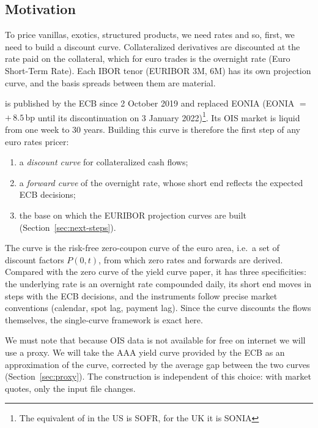 \documentclass[11pt,a4paper]{article}
\theoremstyle{plain}
\theoremstyle{definition}
\newcommand{\bp}{\,\mathrm{bp}}
\newcommand{\estr}{\text{\texteuro STR}}
\begin{document}
\subsection{Motivation}
To price vanillas, exotics, structured products, we need rates and so, first, we need to build a discount curve. Collateralized derivatives are discounted at the rate paid on the collateral, which for euro trades is the overnight rate \estr{} (Euro Short-Term Rate). Each IBOR tenor (EURIBOR 3M, 6M) has its own projection curve, and the basis spreads between them are material.

\estr{} is published by the ECB since 2 October 2019 and replaced EONIA (EONIA $=$ \estr{} $+\,8.5\bp$ until its discontinuation on 3 January 2022)\footnote{The equivalent of \estr{} in the US is SOFR, for the UK it is SONIA}. Its OIS market is liquid from one week to 30 years. Building this curve is therefore the first step of any euro rates pricer:
\begin{enumerate}[label=(\roman*)]
    \item a \emph{discount curve} for collateralized cash flows;
    \item a \emph{forward curve} of the overnight rate, whose short end reflects the expected ECB decisions;
    \item the base on which the EURIBOR projection curves are built (Section~\ref{sec:next-steps}).
\end{enumerate}

The \estr{} curve is the risk-free zero-coupon curve of the euro area, i.e.\ a set of discount factors $P(0,t)$, from which zero rates and forwards are derived. Compared with the zero curve of the yield curve paper, it has three specificities: the underlying rate is an overnight rate compounded daily, its short end moves in steps with the ECB decisions, and the instruments follow precise market conventions (calendar, spot lag, payment lag). Since the \estr{} curve discounts the \estr{} flows themselves, the single-curve framework is exact here.

We must note that because OIS data is not available for free on internet we will use a proxy. We will take the AAA yield curve provided by the ECB as an approximation of the \estr{} curve, corrected by the average gap between the two curves (Section~\ref{sec:proxy}). The construction is independent of this choice: with market quotes, only the input file changes.
\end{document}
